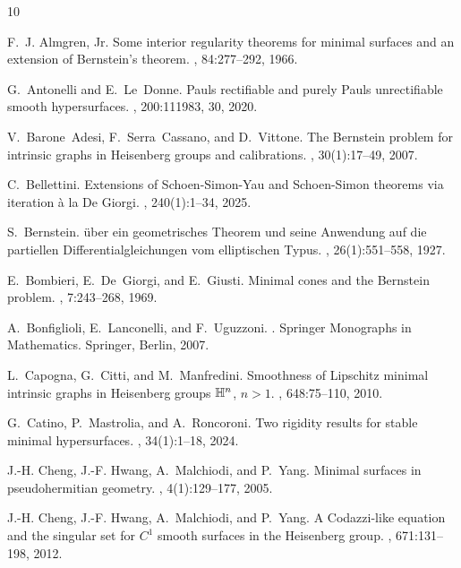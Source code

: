 \begin{thebibliography}{10}

F.~J. Almgren, Jr.
\newblock Some interior regularity theorems for minimal surfaces and an extension of {B}ernstein's theorem.
, 84:277--292, 1966.

G.~Antonelli and E.~Le~Donne.
\newblock Pauls rectifiable and purely {P}auls unrectifiable smooth hypersurfaces.
, 200:111983, 30, 2020.

V.~Barone~Adesi, F.~Serra~Cassano, and D.~Vittone.
\newblock The {B}ernstein problem for intrinsic graphs in {H}eisenberg groups and calibrations.
, 30(1):17--49, 2007.

C.~Bellettini.
\newblock Extensions of {S}choen-{S}imon-{Y}au and {S}choen-{S}imon theorems via iteration \`a{} la {D}e {G}iorgi.
, 240(1):1--34, 2025.

S.~Bernstein.
\newblock \"uber ein geometrisches {T}heorem und seine {A}nwendung auf die partiellen {D}ifferentialgleichungen vom elliptischen {T}ypus.
, 26(1):551--558, 1927.

E.~Bombieri, E.~De~Giorgi, and E.~Giusti.
\newblock Minimal cones and the {B}ernstein problem.
, 7:243--268, 1969.

A.~Bonfiglioli, E.~Lanconelli, and F.~Uguzzoni.
.
\newblock Springer Monographs in Mathematics. Springer, Berlin, 2007.

L.~Capogna, G.~Citti, and M.~Manfredini.
\newblock Smoothness of {L}ipschitz minimal intrinsic graphs in {H}eisenberg groups {$\Bbb H^n$}, {$n>1$}.
, 648:75--110, 2010.

G.~Catino, P.~Mastrolia, and A.~Roncoroni.
\newblock Two rigidity results for stable minimal hypersurfaces.
, 34(1):1--18, 2024.

J.-H. Cheng, J.-F. Hwang, A.~Malchiodi, and P.~Yang.
\newblock Minimal surfaces in pseudohermitian geometry.
, 4(1):129--177, 2005.

J.-H. Cheng, J.-F. Hwang, A.~Malchiodi, and P.~Yang.
\newblock A {C}odazzi-like equation and the singular set for {$C^1$} smooth surfaces in the {H}eisenberg group.
, 671:131--198, 2012.


\end{thebibliography}

